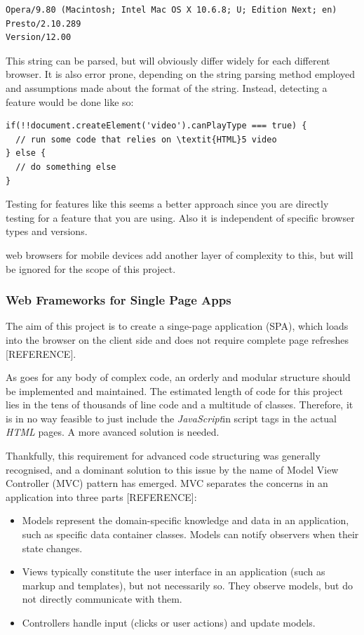 \documentclass[a4paper,11pt,twoside]{article}
\begin{document}
\begin{verbatim}
Opera/9.80 (Macintosh; Intel Mac OS X 10.6.8; U; Edition Next; en) Presto/2.10.289 
Version/12.00
\end{verbatim}

This string can be parsed, but will obviously differ widely for each different browser. It is also error prone, depending on the string parsing method employed and assumptions made about the format of the string. Instead, detecting a feature would be done like so:
\begin{verbatim}
if(!!document.createElement('video').canPlayType === true) {
  // run some code that relies on \textit{HTML}5 video
} else {
  // do something else
}
\end{verbatim}

Testing for features like this seems a better approach since you are directly testing for a feature that you are using. Also it is independent of specific browser types and versions.

web browsers for mobile devices add another layer of complexity to this, but will be ignored for the scope of this project.




\subsubsection{Web Frameworks for Single Page Apps}

The aim of this project is to create a singe-page application (SPA), which loads into the browser on the client side and does not require complete page refreshes [REFERENCE].

As goes for any body of complex code, an orderly and modular structure should be implemented and maintained. The estimated length of code for this project lies in the tens of thousands of line code and a multitude of classes. Therefore, it is in no way feasible to just include the \textit{JavaScript}in script tags in the actual \textit{HTML} pages. A more avanced solution is needed.

Thankfully, this requirement for advanced code structuring was generally recognised, and a dominant solution to this issue by the name of Model View Controller (MVC) pattern has emerged. MVC separates the concerns in an application into three parts [REFERENCE]:

\begin{itemize}
\item Models represent the domain-specific knowledge and data in an application, such as specific data container classes. Models can notify observers when their state changes.
\item Views typically constitute the user interface in an application (such as markup and templates), but not necessarily so. They observe models, but do not directly communicate with them.
\item Controllers handle input (clicks or user actions) and update models.
\end{itemize}
\end{document}
